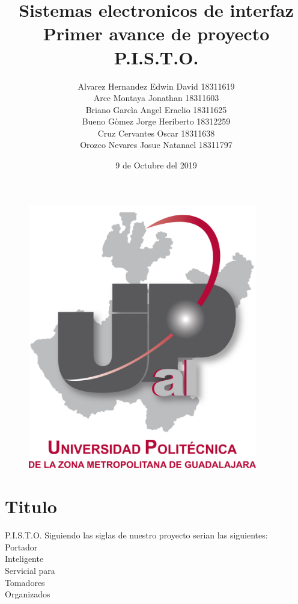 \documentclass[12pt,a4paper]{report}
\begin{document}
\title{\textbf{Sistemas electronicos de interfaz\\Primer avance de proyecto\\P.I.S.T.O.}}
\author{Alvarez Hernandez Edwin David 18311619\\Arce Montaya Jonathan 18311603\\Briano Garcìa Angel Eraclio 18311625\\Bueno Gòmez Jorge Heriberto 18312259\\Cruz Cervantes Oscar 18311638\\Orozco Nevares Josue Natanael 18311797}
\date{9 de Octubre del 2019}

\begin{figure}
\centering
\includegraphics[width=10cm]{UPCDLZMDG5783-logo.png} 
\end{figure}
\maketitle


\section{Titulo}

P.I.S.T.O. Siguiendo las siglas de nuestro proyecto serian las siguientes:\\
Portador\\
Inteligente\\
Servicial para\\
Tomadores\\
Organizados\\
\end{document}
